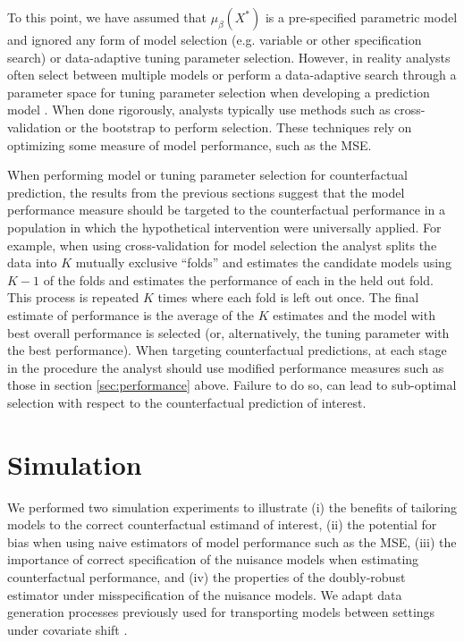 To this point, we have assumed that $\mu_{\beta}(X^*)$ is a pre-specified parametric model and ignored any form of model selection (e.g. variable or other specification search) or data-adaptive tuning parameter selection. However, in reality analysts often select between multiple models or perform a data-adaptive search through a parameter space for tuning parameter selection when developing a prediction model \cite{steyerberg_clinical_2019}. When done rigorously, analysts typically use methods such as cross-validation or the bootstrap to perform selection. These techniques rely on optimizing some measure of model performance, such as the MSE.

When performing model or tuning parameter selection for counterfactual prediction, the results from the previous sections suggest that the model performance measure should be targeted to the counterfactual performance in a population in which the hypothetical intervention were universally applied. For example, when using cross-validation for model selection the analyst splits the data into $K$ mutually exclusive ``folds'' and estimates the candidate models using $K - 1$ of the folds and estimates the performance of each in the held out fold. This process is repeated $K$ times where each fold is left out once. The final estimate of performance is the average of the $K$ estimates and the model with best overall performance is selected (or, alternatively, the tuning parameter with the best performance). When targeting counterfactual predictions, at each stage in the procedure the analyst should use modified performance measures such as those in section \ref{sec:performance} above. Failure to do so, can lead to sub-optimal selection with respect to the counterfactual prediction of interest. 


\section{Simulation} \label{sec:simulation}
We performed two simulation experiments to illustrate (i) the benefits of tailoring models to the correct counterfactual estimand of interest, (ii) the potential for bias when using naive estimators of model performance such as the MSE, (iii) the importance of correct specification of the nuisance models when estimating counterfactual performance, and (iv) the properties of the doubly-robust estimator under misspecification of the nuisance models. We adapt data generation processes previously used for transporting models between settings under covariate shift \cite{steingrimsson_transporting_2023,morrison_robust_2022}.

